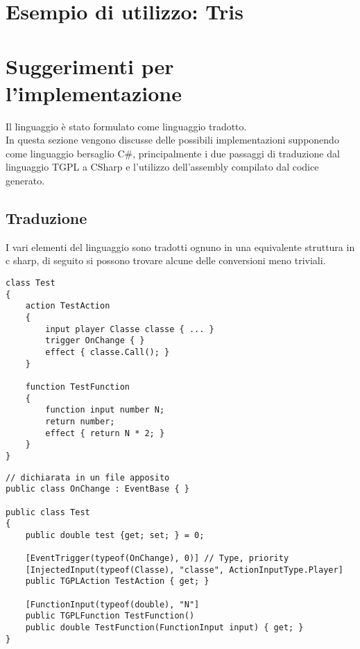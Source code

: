 \newpage
\section{Esempio di utilizzo: Tris}
\begin{mdframed}[
    backgroundcolor=light-gray, 
    roundcorner=10pt,leftmargin=1, 
    rightmargin=1,
    innerleftmargin=15, 
    innertopmargin=15,
    innerbottommargin=15, 
    outerlinewidth=1, 
    linecolor=light-gray]

\end{mdframed}

\newpage
\section{Suggerimenti per l'implementazione}
Il linguaggio è stato formulato come linguaggio tradotto. \\
In questa sezione vengono discusse delle possibili implementazioni 
supponendo come linguaggio bersaglio C\#, principalmente i due passaggi di 
traduzione dal linguaggio TGPL a CSharp e l'utilizzo dell'assembly compilato dal
codice generato.

\subsection{Traduzione}
I vari elementi del linguaggio sono tradotti ognuno in una equivalente 
struttura in c sharp, di seguito si possono trovare alcune delle conversioni 
meno triviali.

\begin{lstlisting}[language=tgpl_small, caption=Codice in TGPL]
class Test
{
    action TestAction
    {
        input player Classe classe { ... }
        trigger OnChange { }
        effect { classe.Call(); }
    }

    function TestFunction
    {
        function input number N;
        return number;
        effect { return N * 2; }
    }
}
\end{lstlisting}
 
\begin{lstlisting}[style=sharpc_small, caption=Traduzione in CSharp]
// dichiarata in un file apposito
public class OnChange : EventBase { } 

public class Test
{
    public double test {get; set; } = 0;

    [EventTrigger(typeof(OnChange), 0)] // Type, priority
    [InjectedInput(typeof(Classe), "classe", ActionInputType.Player]
    public TGPLAction TestAction { get; }

    [FunctionInput(typeof(double), "N"]
    public TGPLFunction TestFunction()
    public double TestFunction(FunctionInput input) { get; }
}
\end{lstlisting}

